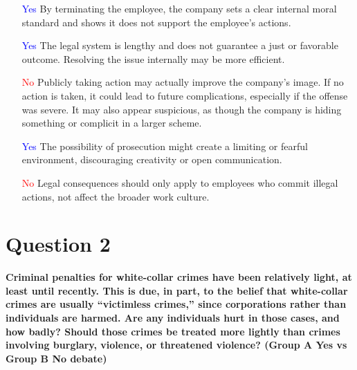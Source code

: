 \documentclass[12pt]{article}
\begin{document}
\begin{itemize}
    \item [\textcolor{blue}{Yes}] By terminating the employee, the company sets a clear internal moral standard and shows it does not support the employee's actions.

    \item [\textcolor{blue}{Yes}] The legal system is lengthy and does not guarantee a just or favorable outcome. Resolving the issue internally may be more efficient.

    \item [\textcolor{red}{No}] Publicly taking action may actually improve the company’s image. If no action is taken, it could lead to future complications, especially if the offense was severe. It may also appear suspicious, as though the company is hiding something or complicit in a larger scheme.

    \item [\textcolor{blue}{Yes}] The possibility of prosecution might create a limiting or fearful environment, discouraging creativity or open communication.

    \item [\textcolor{red}{No}] Legal consequences should only apply to employees who commit illegal actions, not affect the broader work culture.
\end{itemize}

\section*{Question 2}
\textbf{Criminal penalties for white-collar crimes have been relatively light, at least until recently. This is due, in part, to the belief that white-collar crimes are usually “victimless crimes,” since corporations rather than individuals are harmed. Are any individuals hurt in those cases, and how badly? Should those crimes be treated more lightly than crimes involving burglary, violence, or threatened violence? (Group A Yes vs Group B No debate)}
\end{document}
